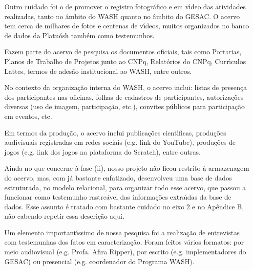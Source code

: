 \documentclass[
12pt,		%
openright,	%
twoside,  %
a4paper,			%
chapter=TITLE,		%
english,			%
french,				%
spanish,			%
brazil				%
]{USPSC-classe/USPSC}
\begin{document}
Outro cuidado foi o de promover o registro fotogr\'afico e em v\'{\i}deo das atividades realizadas, tanto no \^ambito do WASH quanto no \^ambito do GESAC. O acervo tem cerca de milhares de fotos e centenas de v\'{\i}deos, muitos organizados no banco de dados da Platu\'osh tamb\'em como testemunhos.










Fazem parte do acervo de pesquisa os documentos oficiais, tais como Portarias, Planos de Trabalho de Projetos junto ao CNPq, Relat\'orios do CNPq, Curr\'{\i}culos Lattes, termos de ades\~ao institucional ao WASH, entre outros.










No contexto da organiza\c{c}\~ao interna do WASH, o acervo inclui: listas de presen\c{c}a dos participantes nas oficinas, folhas de cadastros de participantes, autoriza\c{c}\~oes diversas (uso de imagem, participa\c{c}\~ao, etc.), convites p\'ublicos  para participa\c{c}\~ao em eventos, etc.










Em termos da produ\c{c}\~ao, o acervo inclui publica\c{c}\~oes cient\'{\i}ficas, produ\c{c}\~oes audivisuais registradas em redes sociais (e.g. link do YouTube), produ\c{c}\~oes de jogos (e.g. link dos jogos na plataforma do Scratch), entre outras.










Ainda no que concerne \`a fase (ii), nosso projeto n\~ao ficou restrito \`a armazenagem do acervo, mas, com j\'a bastante enfatizado, desenvolveu uma base de dados estruturada, no modelo relacional, para organizar todo esse acervo, que passou a funcionar como testemunho rastre\'avel das informa\c{c}\~oes extra\'{\i}das da base de dados. Esse assunto \'e tratado com bastante cuidado no eixo 2 e no Ap\^endice B, n\~ao cabendo repetir essa descri\c{c}\~ao aqui.










Um elemento important\'{\i}ssimo de nossa pesquisa foi a realiza\c{c}\~ao de entrevistas com testemunhas dos fatos em caracteriza\c{c}\~ao. Foram feitos v\'arios formatos: por meio audiovisual (e.g. Profa. Afira Ripper), por escrito (e.g. implementadores do GESAC) ou presencial (e.g. coordenador do Programa WASH).
\end{document}
